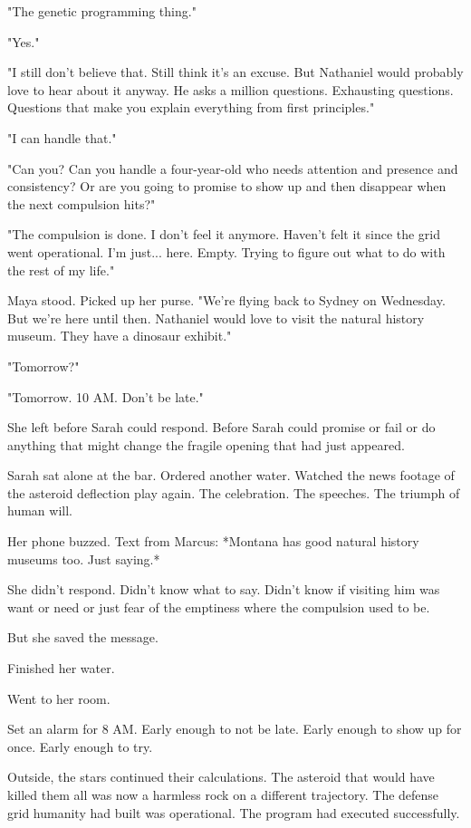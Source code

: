 "The genetic programming thing."

"Yes."

"I still don't believe that. Still think it's an excuse. But Nathaniel would probably love to hear about it anyway. He asks a million questions. Exhausting questions. Questions that make you explain everything from first principles."

"I can handle that."

"Can you? Can you handle a four-year-old who needs attention and presence and consistency? Or are you going to promise to show up and then disappear when the next compulsion hits?"

"The compulsion is done. I don't feel it anymore. Haven't felt it since the grid went operational. I'm just... here. Empty. Trying to figure out what to do with the rest of my life."

Maya stood. Picked up her purse. "We're flying back to Sydney on Wednesday. But we're here until then. Nathaniel would love to visit the natural history museum. They have a dinosaur exhibit."

"Tomorrow?"

"Tomorrow. 10 AM. Don't be late."

She left before Sarah could respond. Before Sarah could promise or fail or do anything that might change the fragile opening that had just appeared.

Sarah sat alone at the bar. Ordered another water. Watched the news footage of the asteroid deflection play again. The celebration. The speeches. The triumph of human will.

Her phone buzzed. Text from Marcus: *Montana has good natural history museums too. Just saying.*

She didn't respond. Didn't know what to say. Didn't know if visiting him was want or need or just fear of the emptiness where the compulsion used to be.

But she saved the message.

Finished her water.

Went to her room.

Set an alarm for 8 AM. Early enough to not be late. Early enough to show up for once. Early enough to try.

Outside, the stars continued their calculations. The asteroid that would have killed them all was now a harmless rock on a different trajectory. The defense grid humanity had built was operational. The program had executed successfully.

